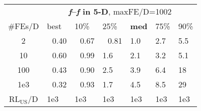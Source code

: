 \begin{tabular}{c|llllll}
 & \multicolumn{6}{|c}{\textbf{\textit{f}\raisebox{-0.35ex}{1}--\textit{f}\raisebox{-0.35ex}{24} in 5-D}, maxFE/D=1002}\\
\#FEs/D & best & 10\% & 25\% & \textbf{med} & 75\% & 90\%\\
2 & ~\,0.40 & ~\,0.67 & ~\,0.81 & \hspace*{1ex}1.0 & \hspace*{1ex}2.7 & \hspace*{1ex}5.5\\
10 & ~\,0.60 & ~\,0.99 & \hspace*{1ex}1.6 & \hspace*{1ex}2.1 & \hspace*{1ex}3.2 & \hspace*{1ex}5.1\\
100 & ~\,0.43 & ~\,0.90 & \hspace*{1ex}2.5 & \hspace*{1ex}3.9 & \hspace*{1ex}6.4 & 18\\
1e3 & ~\,0.32 & ~\,0.93 & \hspace*{1ex}1.7 & \hspace*{1ex}4.5 & \hspace*{1ex}8.5 & 29\\
$\text{RL}_{\text{US}}$/D & 1e3 & 1e3 & 1e3 & 1e3 & 1e3 & 1e3
\end{tabular}
